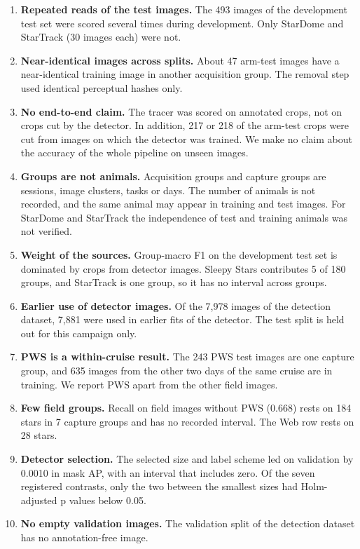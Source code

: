 \begin{enumerate}
\item \textbf{Repeated reads of the test images.} The 493 images of the development test set were scored several times during development. Only StarDome and StarTrack (30 images each) were not.
\item \textbf{Near-identical images across splits.} About 47 arm-test images have a near-identical training image in another acquisition group. The removal step used identical perceptual hashes only.
\item \textbf{No end-to-end claim.} The tracer was scored on annotated crops, not on crops cut by the detector. In addition, 217 or 218 of the arm-test crops were cut from images on which the detector was trained. We make no claim about the accuracy of the whole pipeline on unseen images.
\item \textbf{Groups are not animals.} Acquisition groups and capture groups are sessions, image clusters, tasks or days. The number of animals is not recorded, and the same animal may appear in training and test images. For StarDome and StarTrack the independence of test and training animals was not verified.
\item \textbf{Weight of the sources.} Group-macro F1 on the development test set is dominated by crops from detector images. Sleepy Stars contributes 5 of 180 groups, and StarTrack is one group, so it has no interval across groups.
\item \textbf{Earlier use of detector images.} Of the 7,978 images of the detection dataset, 7,881 were used in earlier fits of the detector. The test split is held out for this campaign only.
\item \textbf{PWS is a within-cruise result.} The 243 PWS test images are one capture group, and 635 images from the other two days of the same cruise are in training. We report PWS apart from the other field images.
\item \textbf{Few field groups.} Recall on field images without PWS (0.668) rests on 184 stars in 7 capture groups and has no recorded interval. The Web row rests on 28 stars.
\item \textbf{Detector selection.} The selected size and label scheme led on validation by 0.0010 in mask AP, with an interval that includes zero. Of the seven registered contrasts, only the two between the smallest sizes had Holm-adjusted p values below 0.05.
\item \textbf{No empty validation images.} The validation split of the detection dataset has no annotation-free image.

\end{enumerate}
